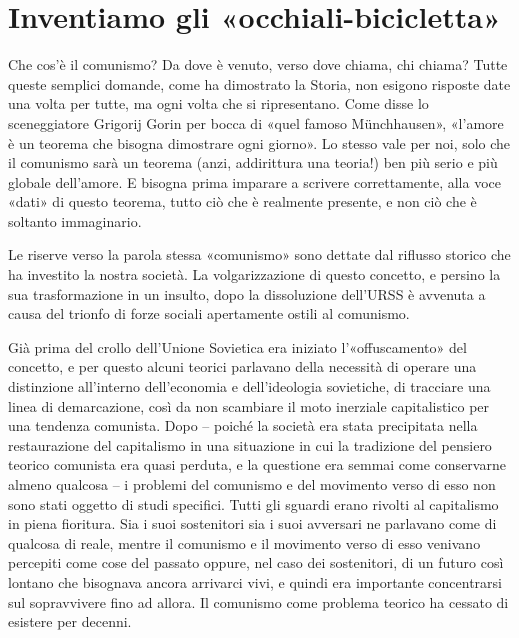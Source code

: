 \documentclass[12pt,a4paper,openany]{book}
\begin{document}
\ifSubfilesClassLoaded{\setcounter{page}{4}}{}
\section{Inventiamo gli «occhiali-bicicletta»}
\label{sec:01_inventiamo_occhiali}

Che cos'è il comunismo? Da dove è venuto, verso dove chiama, chi chiama? Tutte queste semplici domande, come ha dimostrato la Storia, non esigono risposte date una volta per tutte, ma ogni volta che si ripresentano. Come disse lo sceneggiatore Grigorij Gorin per bocca di «quel famoso Münchhausen», «l'amore è un teorema che bisogna dimostrare ogni giorno». Lo stesso vale per noi, solo che il comunismo sarà un teorema (anzi, addirittura una teoria!) ben più serio e più globale dell'amore. E bisogna prima imparare a scrivere correttamente, alla voce «dati» di questo teorema, tutto ciò che è realmente presente, e non ciò che è soltanto immaginario.

Le riserve verso la parola stessa «comunismo» sono dettate dal riflusso storico che ha investito la nostra società. La volgarizzazione di questo concetto, e persino la sua trasformazione in un insulto, dopo la dissoluzione dell'URSS è avvenuta a causa del trionfo di forze sociali apertamente ostili al comunismo.

Già prima del crollo dell'Unione Sovietica era iniziato l'«offuscamento» del concetto, e per questo alcuni teorici parlavano della necessità di operare una distinzione all'interno dell'economia e dell'ideologia sovietiche, di tracciare una linea di demarcazione, così da non scambiare il moto inerziale capitalistico per una tendenza comunista. Dopo – poiché la società era stata precipitata nella restaurazione del capitalismo in una situazione in cui la tradizione del pensiero teorico comunista era quasi perduta, e la questione era semmai come conservarne almeno qualcosa – i problemi del comunismo e del movimento verso di esso non sono stati oggetto di studi specifici. Tutti gli sguardi erano rivolti al capitalismo in piena fioritura. Sia i suoi sostenitori sia i suoi avversari ne parlavano come di qualcosa di reale, mentre il comunismo e il movimento verso di esso venivano percepiti come cose del passato oppure, nel caso dei sostenitori, di un futuro così lontano che bisognava ancora arrivarci vivi, e quindi era importante concentrarsi sul sopravvivere fino ad allora. Il comunismo come problema teorico ha cessato di esistere per decenni.
\end{document}

